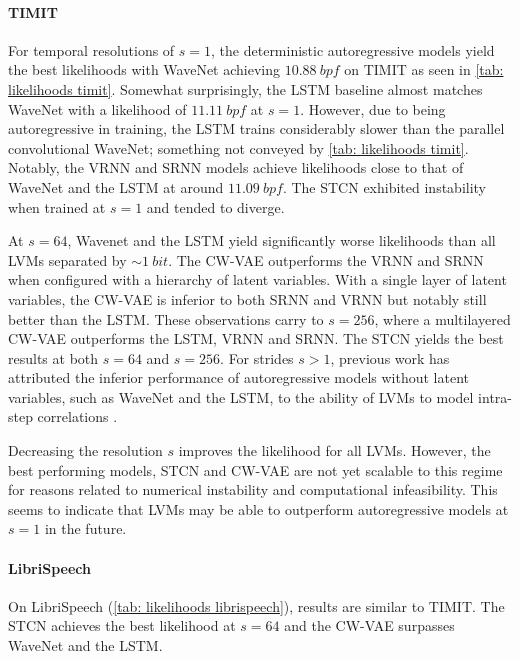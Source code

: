 {\paragraph{TIMIT}
For temporal resolutions of $s=1$, the deterministic autoregressive models yield the best likelihoods with WaveNet achieving $\SI{10.88}{bpf}$ on TIMIT as seen in \cref{tab: likelihoods timit}. 
Somewhat surprisingly, the LSTM baseline almost matches WaveNet with a likelihood of $\SI{11.11}{bpf}$ at $s=1$. However, due to being autoregressive in training, the LSTM trains considerably slower than the parallel convolutional WaveNet; something not conveyed by \cref{tab: likelihoods timit}. 
Notably, the VRNN and SRNN models achieve likelihoods close to that of WaveNet and the LSTM at around $\SI{11.09}{bpf}$. The STCN exhibited instability when trained at $s=1$ and tended to diverge.

At $s=64$, Wavenet and the LSTM yield significantly worse likelihoods than all LVMs separated by $\sim\SI{1}{bit}$.
The CW-VAE outperforms the VRNN and SRNN when configured with a hierarchy of latent variables. 
With a single layer of latent variables, the CW-VAE is inferior to both SRNN and VRNN but notably still better than the LSTM. 
These observations carry to $s=256$, where a multilayered CW-VAE outperforms the LSTM, VRNN and SRNN. 
The STCN yields the best results at both $s=64$ and $s=256$. 
For strides $s>1$, previous work has attributed the inferior performance of autoregressive models without latent variables, such as WaveNet and the LSTM, to the ability of LVMs to model intra-step correlations \cite{lai_re-examination_2019}. 

Decreasing the resolution $s$ improves the likelihood for all LVMs. However, the best performing models, STCN and CW-VAE are not yet scalable to this regime for reasons related to numerical instability and computational infeasibility. This seems to indicate that LVMs may be able to outperform autoregressive models at $s=1$ in the future.
\paragraph{LibriSpeech}
On LibriSpeech (\cref{tab: likelihoods librispeech}), results are similar to TIMIT. The STCN achieves the best likelihood at $s=64$ and the CW-VAE surpasses WaveNet and the LSTM. 
}
